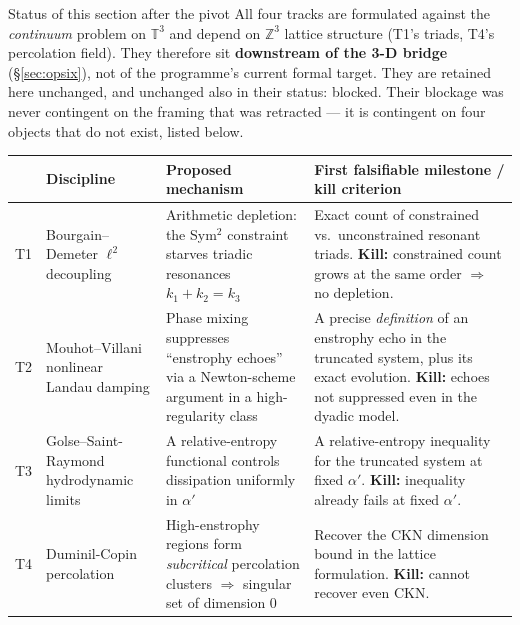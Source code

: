 \documentclass[11pt,a4paper]{article}
\newcommand{\T}{\mathbb{T}}
\newcommand{\Z}{\mathbb{Z}}
\theoremstyle{definition}
\theoremstyle{plain}
\begin{document}
\begin{keybox}{Status of this section after the pivot}
All four tracks are formulated against the \emph{continuum} problem on $\T^3$ and depend on
$\Z^3$ lattice structure (T1's triads, T4's percolation field). They therefore sit
\textbf{downstream of the 3-D bridge} (\S\ref{sec:opsix}), not of the programme's current formal
target. They are retained here unchanged, and unchanged also in their status: blocked. Their
blockage was never contingent on the framing that was retracted --- it is contingent on four
objects that do not exist, listed below.
\end{keybox}

{\small
\setlength\LTleft{0pt}\setlength\LTright{0pt}
\begin{longtable}{@{}p{0.7cm}p{3.3cm}p{5.0cm}p{5.4cm}@{}}
\toprule
& \textbf{Discipline} & \textbf{Proposed mechanism} & \textbf{First falsifiable milestone / kill criterion} \\
\midrule
\endhead
T1 & Bourgain--Demeter $\ell^2$ decoupling \cite{bourgain-demeter} & Arithmetic depletion: the Sym$^2$ constraint starves triadic resonances $k_1+k_2=k_3$ & Exact count of constrained vs.\ unconstrained resonant triads. \textbf{Kill:} constrained count grows at the same order $\Rightarrow$ no depletion. \\
\addlinespace
T2 & Mouhot--Villani nonlinear Landau damping \cite{mouhot-villani} & Phase mixing suppresses ``enstrophy echoes'' via a Newton-scheme argument in a high-regularity class & A precise \emph{definition} of an enstrophy echo in the truncated system, plus its exact evolution. \textbf{Kill:} echoes not suppressed even in the dyadic model. \\
\addlinespace
T3 & Golse--Saint-Raymond hydrodynamic limits \cite{golse-saintraymond} & A relative-entropy functional controls dissipation uniformly in $\alpha'$ & A relative-entropy inequality for the truncated system at fixed $\alpha'$. \textbf{Kill:} inequality already fails at fixed $\alpha'$. \\
\addlinespace
T4 & Duminil-Copin percolation \cite{duminil-copin} & High-enstrophy regions form \emph{subcritical} percolation clusters $\Rightarrow$ singular set of dimension 0 & Recover the CKN dimension bound \cite{ckn1982} in the lattice formulation. \textbf{Kill:} cannot recover even CKN. \\
\bottomrule
\end{longtable}
}
\end{document}
